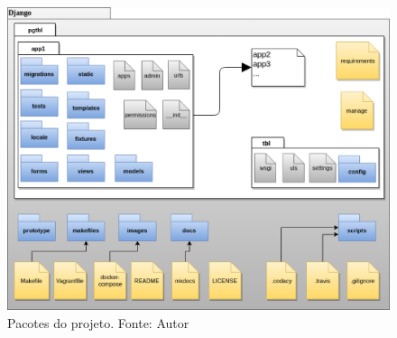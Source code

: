 \begin{figure}[h!]
	\centering
  \includegraphics[keepaspectratio=true,scale=0.5]{figuras/pacotes.eps}
  \caption[Pacotes do projeto.]{Pacotes do projeto. Fonte: Autor}
	\label{fig:pacotes}
\end{figure}

